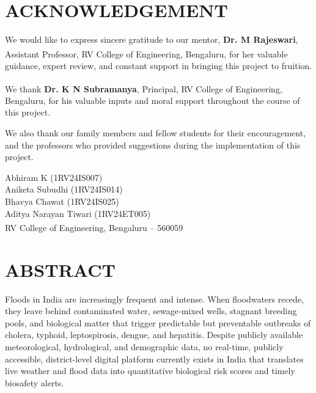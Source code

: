 \documentclass[12pt,a4paper]{report}
\begin{document}
\setcounter{page}{2}

\newpage
\thispagestyle{plain}
\chapter*{ACKNOWLEDGEMENT}

We would like to express sincere gratitude to our mentor, \textbf{Dr. M Rajeswari}, Assistant Professor, RV College of Engineering\textsuperscript{\textregistered}, Bengaluru, for her valuable guidance, expert review, and constant support in bringing this project to fruition.

We thank \textbf{Dr. K N Subramanya}, Principal, RV College of Engineering\textsuperscript{\textregistered}, Bengaluru, for his valuable inputs and moral support throughout the course of this project.

We also thank our family members and fellow students for their encouragement, and the professors who provided suggestions during the implementation of this project.

\vspace{24pt}
\noindent Abhiram K (1RV24IS007) \\
Aniketa Subudhi (1RV24IS014) \\
Bhavya Chawat (1RV24IS025) \\
Aditya Narayan Tiwari (1RV24ET005) \\[4pt]
RV College of Engineering\textsuperscript{\textregistered}, Bengaluru -- 560059

\setcounter{page}{3}

\newpage
\thispagestyle{plain}
\chapter*{ABSTRACT}

Floods in India are increasingly frequent and intense. When floodwaters recede, they leave behind contaminated water, sewage-mixed wells, stagnant breeding pools, and biological matter that trigger predictable but preventable outbreaks of cholera, typhoid, leptospirosis, dengue, and hepatitis. Despite publicly available meteorological, hydrological, and demographic data, no real-time, publicly accessible, district-level digital platform currently exists in India that translates live weather and flood data into quantitative biological risk scores and timely biosafety alerts.
\end{document}
